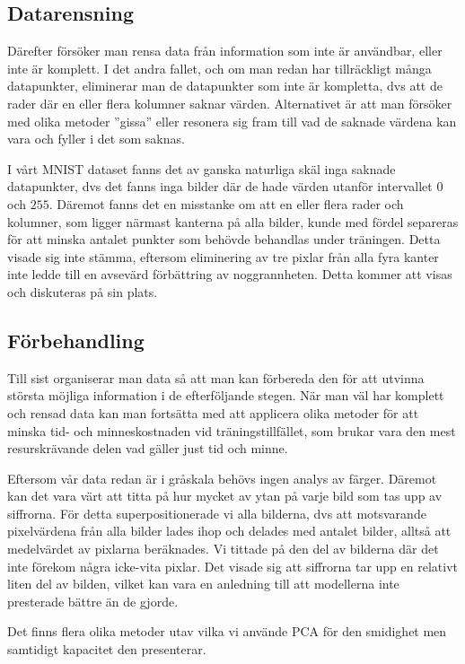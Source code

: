 \documentclass[12pt,a4paper]{article}
\begin{document}
\subsection{Datarensning}

Därefter försöker man rensa data från information som inte är användbar, eller inte är komplett. I det andra fallet, och om man redan har tillräckligt många datapunkter, eliminerar man de datapunkter som inte är kompletta, dvs att de rader där en eller flera kolumner saknar värden. Alternativet är att man försöker med olika metoder ''gissa'' eller resonera sig fram till vad de saknade värdena kan vara och fyller i det som saknas.

I vårt MNIST dataset fanns det av ganska naturliga skäl inga saknade datapunkter, dvs det fanns inga bilder där de hade värden utanför intervallet $0$ och $255$. Däremot fanns det en misstanke om att en eller flera rader och kolumner, som ligger närmast kanterna på alla bilder, kunde med fördel separeras för att minska antalet punkter som behövde behandlas under träningen. Detta visade sig inte stämma, eftersom eliminering av tre pixlar från alla fyra kanter inte ledde till en  avsevärd förbättring av noggrannheten. Detta kommer att visas och diskuteras på sin plats.

\subsection{Förbehandling}

Till sist organiserar man data så att man kan förbereda den för att utvinna största möjliga information i de efterföljande stegen. När man väl har komplett och rensad data kan man fortsätta med att applicera olika metoder för att minska tid- och minneskostnaden vid träningstillfället, som brukar vara den mest resurskrävande delen vad gäller just tid och minne.

Eftersom vår data redan är i gråskala behövs ingen analys av färger. Däremot kan det vara värt att titta på hur mycket av ytan på varje bild som tas upp av siffrorna. För detta superpositionerade vi alla bilderna, dvs att motsvarande pixelvärdena från alla bilder lades ihop och delades med antalet bilder, alltså att medelvärdet av pixlarna beräknades. Vi tittade på den del av bilderna där det inte förekom några icke-vita pixlar. Det visade sig att siffrorna tar upp en relativt liten del av bilden, vilket kan vara en anledning till att modellerna inte presterade bättre än de gjorde.

Det finns flera olika metoder utav vilka vi använde PCA för den smidighet men samtidigt kapacitet den presenterar.
\end{document}
